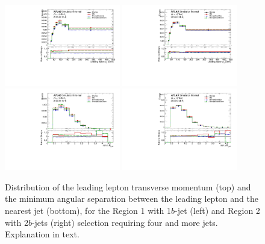 \begin{figure}[!htb]
\centering
\includegraphics[width=0.45\textwidth]{Plots/ttV/c_Region_0_lep_Pt_0}
\includegraphics[width=0.45\textwidth]{Plots/ttV/c_Region_1_lep_Pt_0}\\
\includegraphics[width=0.45\textwidth]{Plots/ttV/c_Region_0_min_DRl0j}
\includegraphics[width=0.45\textwidth]{Plots/ttV/c_Region_1_min_DRl0j}\\
  \caption{Distribution of the leading lepton transverse momentum (top) and the minimum angular separation between the leading lepton and the nearest jet (bottom), for the Region 1 with 1$b$-jet (left) and Region 2 with 2$b$-jets (right) selection requiring four and more jets. Explanation in text.
  \label{ttV:lep_kin}}
\end{figure}

